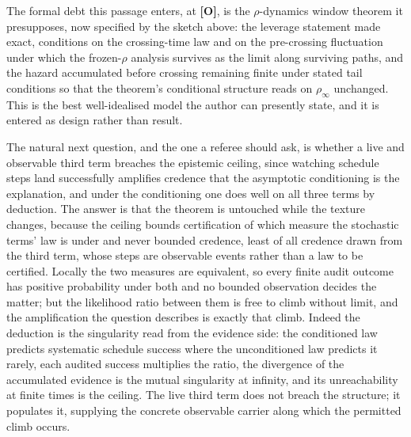 The formal debt this passage enters, at \textbf{[O]}, is the
$\rho$-dynamics window theorem it presupposes, now specified by the
sketch above: the leverage statement made exact, conditions on the
crossing-time law and on the pre-crossing fluctuation under which
the frozen-$\rho$ analysis survives as the limit along surviving
paths, and the hazard accumulated before crossing remaining finite
under stated tail conditions so that the theorem's conditional
structure reads on $\rho_\infty$ unchanged. This is the best
well-idealised model the author can presently state, and it is
entered as design rather than result.

\begin{remark}\label{sch:rem:thirdceiling}
The natural next question, and the one a referee should ask, is
whether a live and observable third term breaches the epistemic
ceiling, since watching schedule steps land successfully amplifies
credence that the asymptotic conditioning is the explanation, and
under the conditioning one does well on all three terms by deduction.
The answer is that the theorem is untouched while the texture
changes, because the ceiling bounds certification of which measure
the stochastic terms' law is under and never bounded credence, least
of all credence drawn from the third term, whose steps are
observable events rather than a law to be certified. Locally the two measures are equivalent, so every finite
audit outcome has positive probability under both and no bounded
observation decides the matter; but the likelihood ratio between
them is free to climb without limit, and the amplification the
question describes is exactly that climb. Indeed the deduction is
the singularity read from the evidence side: the conditioned law
predicts systematic schedule success where the unconditioned law
predicts it rarely, each audited success multiplies the ratio, the
divergence of the accumulated evidence is the mutual singularity at
infinity, and its unreachability at finite times is the ceiling. The
live third term does not breach the structure; it populates it,
supplying the concrete observable carrier along which the permitted
climb occurs.


\end{remark}
